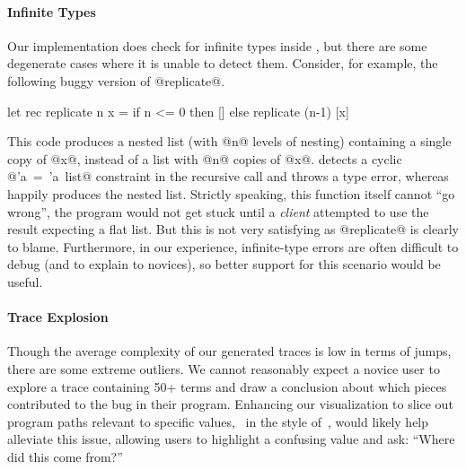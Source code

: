 \paragraph{Infinite Types}
Our implementation does check for infinite types inside \forcesym, but
there are some degenerate cases where it is unable to detect
them. Consider, for example, the following buggy version of @replicate@.
%
\begin{code}
  let rec replicate n x =
    if n <= 0 then
      []
    else
      replicate (n-1) [x]
\end{code}
%
This code produces a nested list (with @n@ levels of nesting) containing
a single copy of @x@, instead of a list with @n@ copies of @x@. \ocaml
detects a cyclic \hbox{@'a = 'a list@} constraint in the recursive call
and throws a type error, whereas \nanomaly happily %
produces the nested list.  Strictly speaking, this function itself cannot
``go wrong'', the program would not get stuck until a \emph{client}
attempted to use the result expecting a flat list. But this is not very
satisfying as @replicate@ is clearly to blame. Furthermore, in our
experience, infinite-type errors are often difficult to %
debug (and to explain to novices), so better support for this scenario
would be useful.

\paragraph{Trace Explosion}
Though the average complexity of our generated traces is low in terms of
jumps, there are some extreme outliers. We cannot reasonably expect a
novice user to explore a trace containing 50+ terms and draw a
conclusion about which pieces contributed to the bug in their
program. Enhancing our visualization to slice out program paths relevant
to specific values, \eg\ in the style of~\cite{perera_functional_2012},
would likely help alleviate this issue, allowing users to
highlight a confusing value and ask: ``Where did this come from?''


